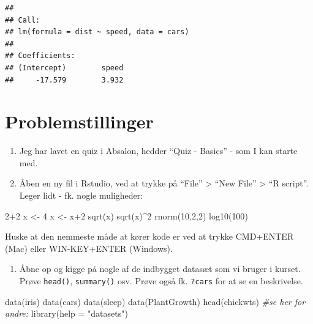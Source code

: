 \documentclass[
]{book}
\newenvironment{Shaded}{\begin{snugshade}}{\end{snugshade}}
\newcommand{\AttributeTok}[1]{\textcolor[rgb]{0.77,0.63,0.00}{#1}}
\newcommand{\CommentTok}[1]{\textcolor[rgb]{0.56,0.35,0.01}{\textit{#1}}}
\newcommand{\DecValTok}[1]{\textcolor[rgb]{0.00,0.00,0.81}{#1}}
\newcommand{\FunctionTok}[1]{\textcolor[rgb]{0.00,0.00,0.00}{#1}}
\newcommand{\NormalTok}[1]{#1}
\newcommand{\OtherTok}[1]{\textcolor[rgb]{0.56,0.35,0.01}{#1}}
\newcommand{\SpecialCharTok}[1]{\textcolor[rgb]{0.00,0.00,0.00}{#1}}
\newcommand{\StringTok}[1]{\textcolor[rgb]{0.31,0.60,0.02}{#1}}
\providecommand{\tightlist}{%
  \setlength{\itemsep}{0pt}\setlength{\parskip}{0pt}}
\begin{document}
\begin{verbatim}
## 
## Call:
## lm(formula = dist ~ speed, data = cars)
## 
## Coefficients:
## (Intercept)        speed  
##     -17.579        3.932
\end{verbatim}

\hypertarget{problemstillinger}{%
\section{Problemstillinger}\label{problemstillinger}}

\begin{enumerate}
\def\labelenumi{\arabic{enumi})}
\item
  Jeg har lavet en quiz i Absalon, hedder ``Quiz - Basics'' - som I kan starte med.
\item
  Åben en ny fil i Rstudio, ved at trykke på ``File'' \textgreater{} ``New File'' \textgreater{} ``R script''. Leger lidt - fk. nogle muligheder:
\end{enumerate}

\begin{Shaded}
\begin{Highlighting}[]
\DecValTok{2}\SpecialCharTok{+}\DecValTok{2}
\NormalTok{x }\OtherTok{\textless{}{-}} \DecValTok{4}
\NormalTok{x }\OtherTok{\textless{}{-}}\NormalTok{ x}\SpecialCharTok{+}\DecValTok{2}
\FunctionTok{sqrt}\NormalTok{(x)}
\FunctionTok{sqrt}\NormalTok{(x)}\SpecialCharTok{\^{}}\DecValTok{2}
\FunctionTok{rnorm}\NormalTok{(}\DecValTok{10}\NormalTok{,}\DecValTok{2}\NormalTok{,}\DecValTok{2}\NormalTok{)}
\FunctionTok{log10}\NormalTok{(}\DecValTok{100}\NormalTok{)}
\end{Highlighting}
\end{Shaded}

Huske at den nemmeste måde at kører kode er ved at trykke CMD+ENTER (Mac) eller WIN-KEY+ENTER (Windows).

\begin{enumerate}
\def\labelenumi{\arabic{enumi})}
\setcounter{enumi}{2}
\tightlist
\item
  Åbne op og kigge på nogle af de indbygget datasæt som vi bruger i kurset. Prøve \texttt{head()}, \texttt{summary()} osv. Prøve også fk. \texttt{?cars} for at se en beskrivelse.
\end{enumerate}

\begin{Shaded}
\begin{Highlighting}[]
\FunctionTok{data}\NormalTok{(iris)}
\FunctionTok{data}\NormalTok{(cars)}
\FunctionTok{data}\NormalTok{(sleep)}
\FunctionTok{data}\NormalTok{(PlantGrowth)}
\FunctionTok{head}\NormalTok{(chickwts)}
\CommentTok{\#se her for andre:}
\FunctionTok{library}\NormalTok{(}\AttributeTok{help =} \StringTok{"datasets"}\NormalTok{)}
\end{Highlighting}
\end{Shaded}
\end{document}
